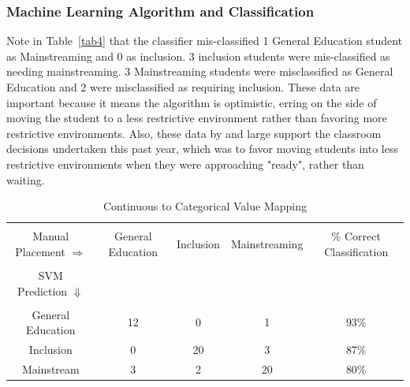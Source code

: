 \documentclass[twoside]{article}
\begin{document}
\subsubsection{Machine Learning Algorithm and Classification}

Note in Table~\ref{tab4} that the classifier mis-classified 1 General Education student as Mainstreaming and 0 as inclusion. 3 inclusion students were mis-classified as needing mainstreaming. 3 Mainstreaming students were misclassified as General Education and 2 were misclassified as requiring inclusion. These data are important because it means the algorithm is optimistic, erring on the side of moving the student to a less restrictive environment rather than favoring more restrictive environments. Also, these data by and large support the classroom decisions undertaken this past year, which was to favor moving students into less restrictive environments when they were approaching "ready", rather than waiting. 
%
%
%
%
\begin{table}[tbp!]
	\centering
	\caption{Continuous to Categorical Value Mapping}
	\label{tab3}
	\begin{tabular}{ccccc}
		\hline \\
		Manual Placement $ \Rightarrow $ & General Education & Inclusion & Mainstreaming & \% Correct Classification\\
		\hline \\
		 SVM Prediction $ \Downarrow $ & & \\ \\
		General Education & 12 & 0 & 1 & 93\% \\
		Inclusion & 0 & 20 & 3 & 87\% \\
		Mainstream & 3 & 2 & 20 & 80\% \\
		\hline
	\end{tabular}
\end{table}
%
%
%
%
%
%
%
%
\end{document}
